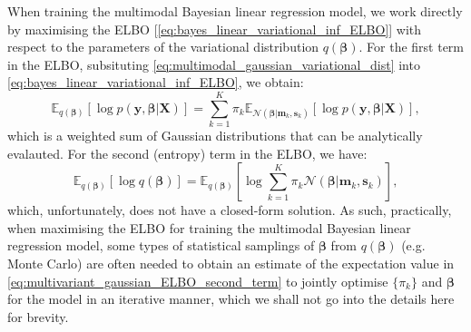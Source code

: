 When training the multimodal Bayesian linear regression model, we work directly by maximising the ELBO [\cref{eq:bayes_linear_variational_inf_ELBO}] with respect to the parameters of the variational distribution $q(\boldsymbol{\beta})$.  For the first term in the ELBO, subsituting \cref{eq:multimodal_gaussian_variational_dist} into \cref{eq:bayes_linear_variational_inf_ELBO}, we obtain:
\begin{equation}
    \label{eq:multivariant_gaussian_ELBO_first_term}
    \mathbb{E}_{q(\boldsymbol{\beta})}\left[\log p(\bm{y},\boldsymbol{\beta}\vert\bm{X})\right]=\sum_{k=1}^{K} \pi_k \mathbb{E}_{\mathcal{N}(\boldsymbol{\beta}|\bm{m}_k,\bm{s}_k)}\left[\log p(\bm{y},\boldsymbol{\beta}\vert\bm{X})\right],
\end{equation}
which is a weighted sum of Gaussian distributions that can be analytically evalauted. For the second (entropy) term in the ELBO, we have:
\begin{equation}
    \label{eq:multivariant_gaussian_ELBO_second_term}
    \mathbb{E}_{q(\boldsymbol{\beta})}\left[\log q(\boldsymbol{\beta})\right] = \mathbb{E}_{q(\boldsymbol{\beta})}\left[\log \sum_{k=1}^{K} \pi_k \mathcal{N}(\boldsymbol{\beta}|\bm{m}_k,\bm{s}_k)\right],
\end{equation}
which, unfortunately, does not have a closed-form solution. As such, practically, when maximising the ELBO for training the multimodal Bayesian linear regression model, some types of statistical samplings of $\boldsymbol{\beta}$ from $q(\boldsymbol{\beta})$ (e.g. Monte Carlo) are often needed to obtain an estimate of the expectation value in \cref{eq:multivariant_gaussian_ELBO_second_term} to jointly optimise $\{\pi_k\}$ and $\boldsymbol{\beta}$ for the model in an iterative manner,\cite{murphy2012machine} which we shall not go into the details here for brevity.

